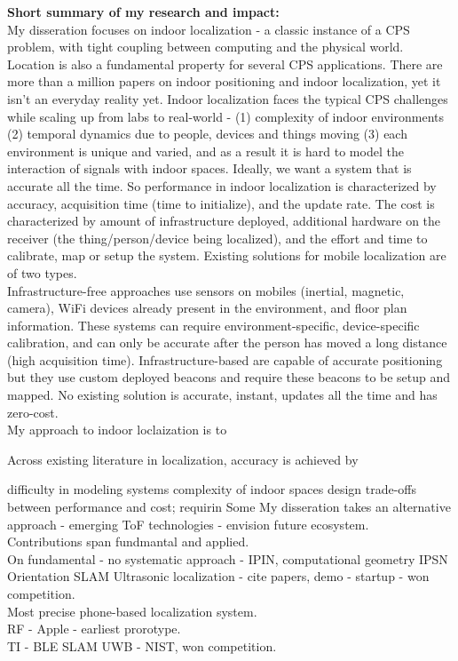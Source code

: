 \documentclass[10pt]{article}
\begin{document}
\textbf{Short summary of my research and impact:}\\
My disseration focuses on indoor localization - a classic instance of a CPS problem, with tight coupling between computing and the physical world. Location is also a fundamental property for several CPS applications. There are more than a million papers on indoor positioning and indoor localization, yet it isn't an everyday reality yet. Indoor localization faces the typical CPS challenges while scaling up from labs to real-world - (1) complexity of indoor environments (2) temporal dynamics due to people, devices and things moving (3) each environment is unique and varied, and as a result it is hard to model the interaction of signals with indoor spaces. Ideally, we want a system that is accurate all the time. So performance in indoor localization is characterized by accuracy, acquisition time (time to initialize), and the update rate. The cost is characterized by amount of infrastructure deployed, additional hardware on the receiver (the thing/person/device being localized), and the effort and time to calibrate, map or setup the system. Existing solutions for mobile localization are of two types. \\

Infrastructure-free approaches use sensors on mobiles (inertial, magnetic, camera), WiFi devices already present in the environment, and floor plan information. These systems can require environment-specific, device-specific calibration, and can only be accurate after the person has moved a long distance (high acquisition time). Infrastructure-based are capable of accurate positioning but they use custom deployed beacons and require these beacons to be setup and mapped. No existing solution is accurate, instant, updates all the time and has zero-cost. \\
My approach to indoor loclaization is to  

Across existing literature in localization, accuracy is achieved by 

difficulty in modeling systems complexity of indoor spaces design trade-offs between performance and cost; requirin Some 
My disseration takes an alternative approach - emerging ToF technologies - envision future ecosystem.\\
Contributions span fundmantal and applied.\\
On fundamental - no systematic approach - IPIN, computational geometry
IPSN
Orientation
SLAM
Ultrasonic localization - cite papers, demo - startup - won competition.\\
Most precise phone-based localization system.\\
RF - Apple - earliest prorotype.\\
TI - BLE SLAM
UWB - NIST, won competition.\\
\end{document}
